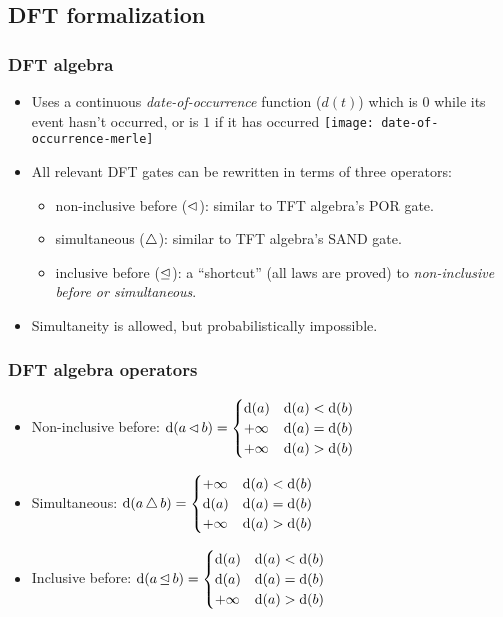 \subsection{DFT formalization}

\begin{frame}
\frametitle{DFT algebra}

\begin{itemize}
  \item Uses a continuous \emph{date-of-occurrence} function ($d(t)$) which is $0$ while its event hasn't occurred, or is $1$ if it has occurred
  \texttt{[image: date-of-occurrence-merle]}
  \item All relevant DFT gates can be rewritten in terms of three operators: 
    \begin{itemize}
      \item non-inclusive before ($\operatorname{\lhd}$): similar to TFT algebra's POR gate.
      \item simultaneous ($\operatorname{\triangle}$): similar to TFT algebra's SAND gate.
      \item inclusive before ($\operatorname{\unlhd}$): a ``shortcut'' (all laws are proved) to \emph{non-inclusive before or simultaneous}.
    \end{itemize}  
  \item Simultaneity is allowed, but probabilistically impossible.
\end{itemize}
\end{frame}


\begin{frame}
\frametitle{DFT algebra operators}

\begin{itemize}
  \item Non-inclusive before:
  $
  \operatorname{d} (a \operatorname{\lhd} b) =
  \begin{cases}
  \operatorname{d}(a) & \operatorname{d}(a) < \operatorname{d}(b)\\
  +\infty & \operatorname{d}(a) = \operatorname{d}(b)\\
  +\infty & \operatorname{d}(a) > \operatorname{d}(b)\\
  \end{cases}
  $
  \item Simultaneous:
  $
  \operatorname{d} (a \operatorname{\triangle} b) =
  \begin{cases}
  +\infty & \operatorname{d}(a) < \operatorname{d}(b)\\
  \operatorname{d}(a) & \operatorname{d}(a) = \operatorname{d}(b)\\
  +\infty & \operatorname{d}(a) > \operatorname{d}(b)\\
  \end{cases}
  $
  \item Inclusive before:
  $
  \operatorname{d} (a \operatorname{\unlhd} b) =
  \begin{cases}
  \operatorname{d}(a) & \operatorname{d}(a) < \operatorname{d}(b)\\
  \operatorname{d}(a) & \operatorname{d}(a) = \operatorname{d}(b)\\
  +\infty & \operatorname{d}(a) > \operatorname{d}(b)\\
  \end{cases}
  $
\end{itemize}
\end{frame}

